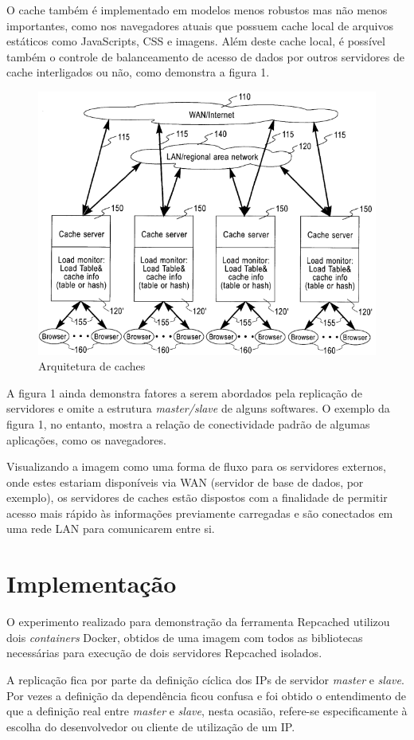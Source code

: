 \documentclass[conference]{IEEEtran}
\begin{document}
O cache também é implementado em modelos menos robustos mas não menos importantes, como nos navegadores atuais que possuem cache local de arquivos estáticos como JavaScripts, CSS e imagens. Além deste cache local, é possível também o controle de balanceamento de acesso de dados por outros servidores de cache interligados ou não, como demonstra a figura 1.

\begin{figure}[h!]
\centerline{\includegraphics[width=0.7\linewidth]{figura1.png}}
\caption{Arquitetura de caches \cite{cachepatent}}
\label{fig}
\end{figure}

A figura 1 ainda demonstra fatores a serem abordados pela replicação de servidores e omite a estrutura \textit{master/slave} de alguns softwares. O exemplo da figura 1, no entanto, mostra a relação de conectividade padrão de algumas aplicações, como os navegadores. 

Visualizando a imagem como uma forma de fluxo para os servidores externos, onde estes estariam disponíveis via WAN (servidor de base de dados, por exemplo), os servidores de caches estão dispostos com a finalidade de permitir acesso mais rápido às informações previamente carregadas e são conectados em uma rede LAN para comunicarem entre si.

\section{Implementação}

O experimento realizado para demonstração da ferramenta Repcached utilizou dois \textit{containers} Docker\cite{docker}, obtidos de uma imagem com todos as bibliotecas necessárias para execução de dois servidores Repcached \cite{repcached} isolados.

A replicação fica por parte da definição cíclica dos IPs de servidor \textit{master} e \textit{slave}. Por vezes a definição da dependência ficou confusa e foi obtido o entendimento de que a definição real entre \textit{master} e \textit{slave}, nesta ocasião, refere-se especificamente à escolha do desenvolvedor ou cliente de utilização de um IP.
\end{document}
